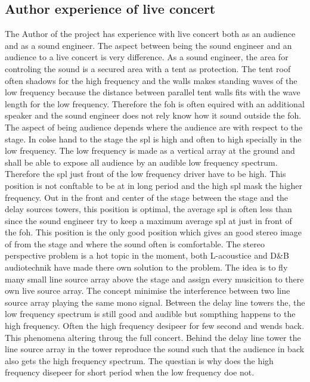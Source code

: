 \subsection{Author experience of live concert}\label{sec:ana:aut_exp_con}
The Author of the project has experience with live concert both as an audience and as a sound engineer. The aspect between being the sound engineer and an audience to a live concert is very difference. As a sound engineer, the area for controling the sound is a secured area with a tent as protection. The tent roof often shadows for the high frequency and the walls makes standing waves of the low frequency because the distance between parallel tent walls fits with the wave length for the low frequency. Therefore the \gls{foh} is often equired with an additional speaker and the sound engineer does not rely know how it sound outside the \gls{foh}. The aspect of being audience depends where the audience are with respect to the stage. In colse hand to the stage the \gls{spl} is high and often to high specially in the low frequency. The low frequency is made as a vertical array at the ground and shall be able to expose all audience by an audible low frequency spectrum. Therefore the \gls{spl} just front of the low frequency driver have to be high. This position is not conftable to be at in long period and the high \gls{spl} mask the higher frequency. Out in the front and center of the stage between the stage and the delay sources towers, this position is optimal, the average \gls{spl} is often less than  since the sound engineer try to keep a maximum average \gls{spl} at  just in front of the \gls{foh}. This position is the only good position which gives an good stereo image of from the stage and where the sound often is comfortable. The stereo perspective problem is a hot topic in the moment, both L-acoustice \citep{l_acoustics_l_isa} and D\&B audiotechnik \citep{dbsoundscape} have made there own solution to the problem. The idea is to fly many small line source array above the stage and assign every musicition to there own live source array. The concept minimise the interference between two line source array playing the same mono signal. 
Between the delay line towers the, the low frequency spectrum is still good and audible but sompthing happens to the high frequency. Often the high frequency desipeer for few second and wends back. This phenomena altering throug the full concert. Behind the delay line tower the line source array in the tower reproduce the sound such that the audience in back also gets the high frequency spectrum. The questian is why does the high frequency disepeer for short period when the low frequency doe not. 

 
